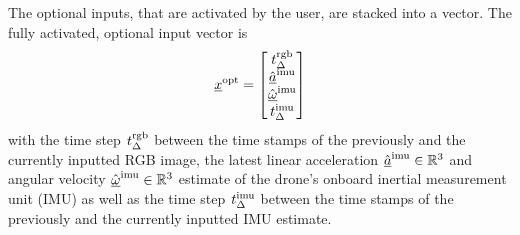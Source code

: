 The optional inputs, that are activated by the user,
are stacked into a vector. The fully activated,
optional input vector is
\begin{align}
    \featvec[]{\text{opt}}{}{}{} 
    =
    \begin{bmatrix}
        \dur[]{\text{rgb}}{}{}{} \\
        \acc[\hat]{\text{imu}}{}{}{} \\
        \angvel[\hat]{\text{imu}}{}{}{} \\
        \dur[]{\text{imu}}{}{}{}
    \end{bmatrix}
\end{align}
with the time step
$\dur[]{\text{rgb}}{}{}{}$
between the time stamps of the previously and the currently inputted RGB image,
the latest linear acceleration
$\acc[\hat]{\text{imu}}{}{}{} \in \mathbb{R}^3$
and angular velocity
$\angvel[\hat]{\text{imu}}{}{}{} \in \mathbb{R}^3$
estimate of the drone's onboard inertial measurement unit (IMU)
as well as the time step
$\dur[]{\text{imu}}{}{}{}$
between the time stamps of the
previously and the currently inputted IMU estimate.








